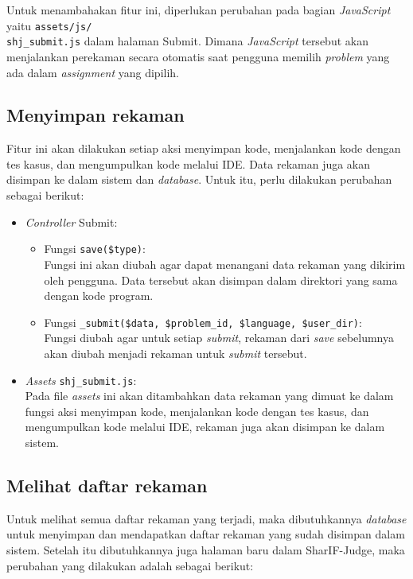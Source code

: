 Untuk menambahakan fitur ini, diperlukan perubahan pada bagian \textit{JavaScript} yaitu \verb|assets/js/|\\\verb|shj_submit.js| dalam halaman Submit. Dimana \textit{JavaScript} tersebut akan menjalankan perekaman secara otomatis saat pengguna memilih \textit{problem} yang ada dalam \textit{assignment} yang dipilih.

\subsection{Menyimpan rekaman}
\label{sub:4:3:menyimpanrekaman}

Fitur ini akan dilakukan setiap aksi menyimpan kode, menjalankan kode dengan tes kasus, dan mengumpulkan kode melalui IDE. Data rekaman juga akan disimpan ke dalam sistem dan \textit{database}. Untuk itu, perlu dilakukan perubahan sebagai berikut:

\begin{itemize}
    \item \textit{Controller} Submit:
          \begin{itemize}
              \item Fungsi \verb|save($type)|: \\
                    Fungsi ini akan diubah agar dapat menangani data rekaman yang dikirim oleh pengguna. Data tersebut akan disimpan dalam direktori yang sama dengan kode program.
              \item Fungsi \verb|_submit($data, $problem_id, $language, $user_dir)|: \\
                    Fungsi diubah agar untuk setiap \textit{submit}, rekaman dari \textit{save} sebelumnya akan diubah menjadi rekaman untuk \textit{submit} tersebut.
          \end{itemize}
    \item \textit{Assets} \verb|shj_submit.js|: \\
          Pada file \textit{assets} ini akan ditambahkan data rekaman yang dimuat ke dalam fungsi aksi menyimpan kode, menjalankan kode dengan tes kasus, dan mengumpulkan kode melalui IDE, rekaman juga akan disimpan ke dalam sistem.
\end{itemize}

\subsection{Melihat daftar rekaman}
\label{sub:4:3:melihatdaftarrekaman}

Untuk melihat semua daftar rekaman yang terjadi, maka dibutuhkannya \textit{database} untuk menyimpan dan mendapatkan daftar rekaman yang sudah disimpan dalam sistem. Setelah itu dibutuhkannya juga halaman baru dalam SharIF-Judge, maka perubahan yang dilakukan adalah sebagai berikut:

